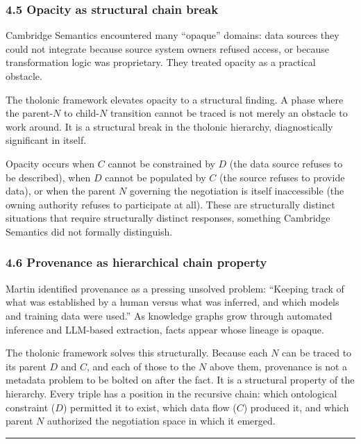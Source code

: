\documentclass[
  11pt,
  letterpaper,
]{article}
\begin{document}
\subsubsection{4.5 Opacity as structural chain
break}\label{opacity-as-structural-chain-break}

Cambridge Semantics encountered many ``opaque'' domains: data sources
they could not integrate because source system owners refused access, or
because transformation logic was proprietary. They treated opacity as a
practical obstacle.

The tholonic framework elevates opacity to a structural finding. A phase
where the parent-\(N\) to child-\(N\) transition cannot be traced is not
merely an obstacle to work around. It is a structural break in the
tholonic hierarchy, diagnostically significant in itself.

Opacity occurs when \(C\) cannot be constrained by \(D\) (the data
source refuses to be described), when \(D\) cannot be populated by \(C\)
(the source refuses to provide data), or when the parent \(N\) governing
the negotiation is itself inaccessible (the owning authority refuses to
participate at all). These are structurally distinct situations that
require structurally distinct responses, something Cambridge Semantics
did not formally distinguish.

\subsubsection{4.6 Provenance as hierarchical chain
property}\label{provenance-as-hierarchical-chain-property}

Martin identified provenance as a pressing unsolved problem: ``Keeping
track of what was established by a human versus what was inferred, and
which models and training data were used.'' As knowledge graphs grow
through automated inference and LLM-based extraction, facts appear whose
lineage is opaque.

The tholonic framework solves this structurally. Because each \(N\) can
be traced to its parent \(D\) and \(C\), and each of those to the \(N\)
above them, provenance is not a metadata problem to be bolted on after
the fact. It is a structural property of the hierarchy. Every triple has
a position in the recursive chain: which ontological constraint (\(D\))
permitted it to exist, which data flow (\(C\)) produced it, and which
parent \(N\) authorized the negotiation space in which it emerged.

\begin{center}\rule{0.5\linewidth}{0.5pt}\end{center}
\end{document}
